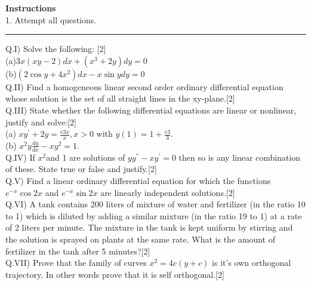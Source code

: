 \documentclass[11pt]{article}
\begin{document}
\textbf{Instructions}\\
1. Attempt all questions.

\rule[0pt]{350pt}{0.25pt}

Q.I) Solve the following: \hspace{9cm}[2]\\

(a)$3x(xy -2)dx + (x^3+2y)dy = 0$\\

(b)$(2\cos{y}+4x^2)dx-x\sin{y}dy=0$\\

Q.II) Find a homogeneous linear second order ordinary differential equation whose solution is the set of all straight lines in the xy-plane.\hspace{4cm}[2]\\

Q.III) State whether the following differential equations are linear or nonlinear, justify and solve:\hspace{10cm}[2]\\

(a) $xy^{'}+2y = \frac{e{3x}}{x} , x>0$ with $y(1)=1+\frac{e{3}}{3}.$\\

(b) $x^2y\frac{dy}{dx}-xy^2=1.$\\

Q.IV) If $x^2$and 1 are solutions of $yy^{''}-xy^{'}=0$ then so is any linear combination of these. State true or false and justify.\hspace{6cm}[2]\\

Q.V) Find a linear ordinary differential equation for which the functions $e^{-x}\cos{2x}$ and $e^{-x}\sin{2x}$ are linearly independent solutions.\hspace{4cm}[2]\\

Q.VI) A tank contains 200 liters of mixture of water and fertilizer (in the ratio 10 to 1) which is diluted by adding a similar mixture (in the ratio 19 to 1) at a rate of 2 liters per minute. The mixture in the tank is kept uniform by stirring and the solution is sprayed on plants at the same rate. What is the amount of fertilizer in the tank after 5 minutes?\hspace{4cm}[2]\\

Q.VII) Prove that the family of curves $x^2=4c(y+c)$ is it's own orthogonal trajectory. In other words prove that it is self orthogonal.\hspace{4cm}[2]\\
\pagebreak
\end{document}
